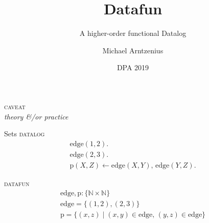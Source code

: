 \documentclass[dvipsnames,fleqn]{beamer}
\title{Datafun}
\subtitle{A higher-order functional Datalog}
\author{Michael Arntzenius}
\institute{University of Birmingham}
\date{DPA 2019}
\providecommand\EMPH\textsc
\newcommand\x\times
\newcommand\N{\mathbb{N}}
\newcommand\kw\textbf
\newcommand\name\text
\newcommand\tset[1]{\{{#1}\}}
\newcommand\eset[1]{\{{#1}\}}
\newcommand\esetfor[2]{\eset{{#1} \mathrel{|} {#2}}}
\newcommand\efor[1]{\kw{for}\;{#1}\;\kw{do}\;}
\newcommand\ewhen[1]{\kw{when}\;{#1}\;\kw{do}\;}
\newcommand\shaded{\color{Gray}}
\newcommand\DATALOG{\EMPH{datalog}}
\newcommand\DATAFUN{\EMPH{datafun}}
\begin{document}
\maketitle

\Large

\begin{frame}{}
  \centering \huge
  \EMPH{caveat}
  \\[1ex]
  \itshape
  {theory}
  \&/or
  {practice}
\end{frame}



\begin{frame}{Sets}\setlength\mathindent{.67em}
  \DATALOG%
  \[
  \begin{array}{l}
    \name{edge}(1,2).\\\name{edge}(2,3).\\
    \name{p}(X,Z) \gets \name{edge}(X,Y),\, \name{edge}(Y,Z).
  \end{array}
  \]
  \vspace{0pt} %

  \DATAFUN%
  \[
  \begin{array}{l}
    \name{edge}, \name{p} : \tset{\N \x \N}\\
    \name{edge} = \eset{(1,2), (2,3)}\\
    \name{p} =
    \esetfor{(x,z)}{(x,y) \in \name{edge},\, (y,z) \in \name{edge}}
  \end{array}
  \]
  \vfill
\end{frame}
\end{document}
